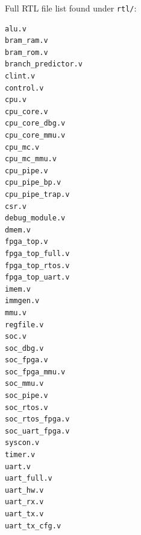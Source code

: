Full RTL file list found under \texttt{rtl/}:

\begin{lstlisting}[language={}]
alu.v
bram_ram.v
bram_rom.v
branch_predictor.v
clint.v
control.v
cpu.v
cpu_core.v
cpu_core_dbg.v
cpu_core_mmu.v
cpu_mc.v
cpu_mc_mmu.v
cpu_pipe.v
cpu_pipe_bp.v
cpu_pipe_trap.v
csr.v
debug_module.v
dmem.v
fpga_top.v
fpga_top_full.v
fpga_top_rtos.v
fpga_top_uart.v
imem.v
immgen.v
mmu.v
regfile.v
soc.v
soc_dbg.v
soc_fpga.v
soc_fpga_mmu.v
soc_mmu.v
soc_pipe.v
soc_rtos.v
soc_rtos_fpga.v
soc_uart_fpga.v
syscon.v
timer.v
uart.v
uart_full.v
uart_hw.v
uart_rx.v
uart_tx.v
uart_tx_cfg.v
\end{lstlisting}

\bigskip
